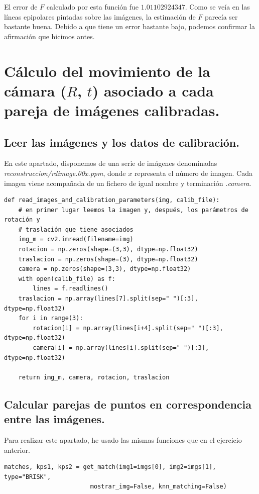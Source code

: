 \documentclass[11pt,a4paper]{article}
\theoremstyle{plain}
\theoremstyle{definition}
\begin{document}
El error de $F$ calculado por esta función fue $1.01102924347$. Como se veía en las líneas epipolares pintadas sobre las imágenes, la estimación de $F$ parecía ser bastante buena. Debido a que tiene un error bastante bajo, podemos confirmar la afirmación que hicimos antes.

\section{Cálculo del movimiento de la cámara ($R$, $t$) asociado a cada pareja de imágenes calibradas.}

\subsection{Leer las imágenes y los datos de calibración.}

En este apartado, disponemos de una serie de imágenes denominadas \textit{reconstruccion/rdimage.00x.ppm}, donde $x$ representa el número de imagen. Cada imagen viene acompañada de un fichero de igual nombre y terminación \textit{.camera}. 

\begin{verbatim}
def read_images_and_calibration_parameters(img, calib_file):
    # en primer lugar leemos la imagen y, después, los parámetros de rotación y
    # traslación que tiene asociados
    img_m = cv2.imread(filename=img)
    rotacion = np.zeros(shape=(3,3), dtype=np.float32)
    traslacion = np.zeros(shape=(3), dtype=np.float32)
    camera = np.zeros(shape=(3,3), dtype=np.float32)
    with open(calib_file) as f:
        lines = f.readlines()
    traslacion = np.array(lines[7].split(sep=" ")[:3], dtype=np.float32)
    for i in range(3):
        rotacion[i] = np.array(lines[i+4].split(sep=" ")[:3], dtype=np.float32)
        camera[i] = np.array(lines[i].split(sep=" ")[:3], dtype=np.float32)

    return img_m, camera, rotacion, traslacion
\end{verbatim}

\subsection{Calcular parejas de puntos en correspondencia entre las imágenes.}

Para realizar este apartado, he usado las mismas funciones que en el ejercicio anterior.

\begin{verbatim}
matches, kps1, kps2 = get_match(img1=imgs[0], img2=imgs[1], type="BRISK", 
                        mostrar_img=False, knn_matching=False)
\end{verbatim}
\end{document}
